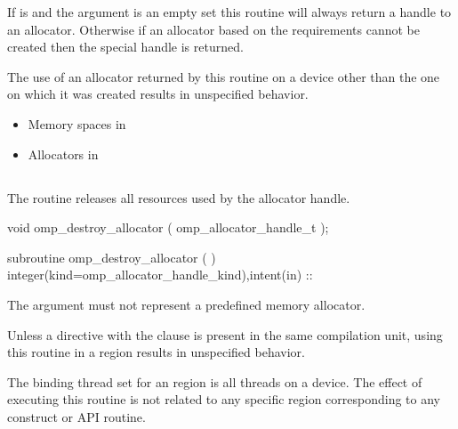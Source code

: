 If  is  and the  argument is an empty set this routine will always return a handle to an allocator. Otherwise if an allocator based on the requirements cannot be created then the special  handle is returned.

The use of an allocator returned by this routine on a device other than the one on which it was created results in unspecified behavior.

\crossreferences
\begin{itemize}
\item Memory spaces in 
\item Allocators in 
\end{itemize}

\subsection{}
\label{subsec:omp_destroy_allocator}

\summary
The  routine releases all resources used by the allocator handle.

\format
\begin{ccppspecific}
\begin{ompcFunction}
void omp_destroy_allocator ( omp_allocator_handle_t );
\end{ompcFunction}
\end{ccppspecific}
\begin{fortranspecific}
\begin{ompfSubroutine}
subroutine omp_destroy_allocator (  )
integer(kind=omp_allocator_handle_kind),intent(in) :: 
\end{ompfSubroutine}
\end{fortranspecific}

\constraints

The  argument must not represent a predefined memory allocator.

Unless a  directive with the  clause is present in the same compilation unit, using this routine in a  region results in unspecified behavior.

\binding

The binding thread set for an  region is all threads on a device.
The effect of executing this routine is not related to any specific region corresponding to any construct or API routine.

